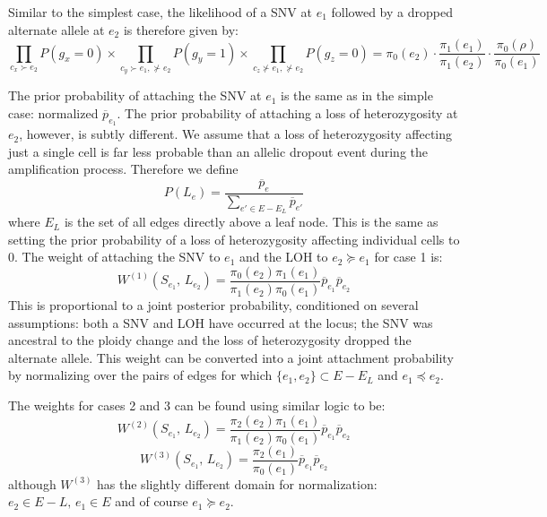\documentclass[../../main.tex]{subfiles}
\begin{document}
Similar to the simplest case, the likelihood of a SNV at $e_1$ followed by a dropped alternate allele at $e_2$ is therefore given by:
\begin{equation*}
    \prod\limits_{c_x\succ e_2}P(g_x = 0)\times\prod\limits_{c_y\succ e_1,\nsucc e_2} P(g_y = 1)\times\prod\limits_{c_z\nsucc e_1, \nsucc e_2} P(g_z=0)
    = \pi_0(e_2)\cdot\frac{\pi_1(e_1)}{\pi_1(e_2)}\cdot\frac{\pi_0(\rho)}{\pi_0(e_1)}
\end{equation*}

The prior probability of attaching the SNV at $e_1$ is the same as in the simple case: normalized $\overline{p}_{e_1}$.
The prior probability of attaching a loss of heterozygosity at $e_2$, however, is subtly different.
We assume that a loss of heterozygosity affecting just a single cell is far less probable than an allelic dropout event during the amplification process.
Therefore we define
\begin{equation*}
    P(L_{e}) = \frac{\overline{p}_e}{\sum_{e'\in E-E_L}\overline{p}_{e'}}
\end{equation*}
where $E_L$ is the set of all edges directly above a leaf node.
This is the same as setting the prior probability of a loss of heterozygosity affecting individual cells to 0.
The weight of attaching the SNV to $e_1$ and the LOH to $e_2\succeq e_1$ for case 1 is:
\begin{equation}
    W^{(1)}(S_{e_1},\,L_{e_2}) = \frac{\pi_0(e_2)\pi_1(e_1)}{\pi_1(e_2)\pi_0(e_1)}\overline{p}_{e_1}\overline{p}_{e_2}
\end{equation}
This is proportional to a joint posterior probability, conditioned on several assumptions: both a SNV and LOH have occurred at the locus; the SNV was ancestral to the ploidy change and the loss of heterozygosity dropped the alternate allele.
This weight can be converted into a joint attachment probability by normalizing over the pairs of edges for which $\{e_1,e_2\}\subset E-E_L$ and $e_1\preceq e_2$.

The weights for cases 2 and 3 can be found using similar logic to be:
\begin{equation}
    W^{(2)}(S_{e_1},\,L_{e_2}) = \frac{\pi_2(e_2)\pi_1(e_1)}{\pi_1(e_2)\pi_0(e_1)}\overline{p}_{e_1}\overline{p}_{e_2}
\end{equation}
\begin{equation}
    W^{(3)}(S_{e_1},\,L_{e_2}) = \frac{\pi_2(e_1)}{\pi_0(e_1)}\overline{p}_{e_1}\overline{p}_{e_2}
\end{equation}
although $W^{(3)}$ has the slightly different domain for normalization: $e_2\in E-L,\,e_1\in E$ and of course $e_1\succeq e_2$.
\end{document}
